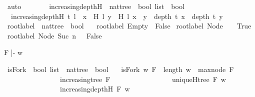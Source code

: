 \begin{isabellebody}
\ auto\ \isanewline
\ \ \isamarkupfalse%
%
\endisatagproof
{\isafoldproof}%
%
\isadelimproof
\isanewline
%
\endisadelimproof
\ \ \isanewline
{}\isamarkupfalse%
\ increasing{\isacharunderscore}depth{\isacharunderscore}H\ {\isacharcolon}{\isacharcolon}\ {\isachardoublequoteopen}nattree\ {\isasymRightarrow}\ bool\ list\ {\isasymRightarrow}\ bool{\isachardoublequoteclose}\ \ \isanewline
\ \ {\isachardoublequoteopen}increasing{\isacharunderscore}depth{\isacharunderscore}H\ t\ l\ {\isacharequal}\ {\isacharparenleft}{\isasymforall}x\ {\isasymin}\ H\ l{\isachardot}\ {\isasymforall}y\ {\isasymin}\ H\ l{\isachardot}\ x\ {\isacharless}\ y\ {\isasymlongrightarrow}\ depth\ t\ x\ {\isacharless}\ depth\ t\ y{\isacharparenright}{\isachardoublequoteclose}\isanewline
\isanewline
{}\isamarkupfalse%
\ root{\isacharunderscore}label{}\ {\isacharcolon}{\isacharcolon}\ {\isachardoublequoteopen}nattree\ {\isasymRightarrow}\ bool{\isachardoublequoteclose}\ \isanewline
\ \ {\isachardoublequoteopen}root{\isacharunderscore}label{}\ Empty\ {\isacharequal}\ False{\isachardoublequoteclose}\isanewline
{\isacharbar}\ {\isachardoublequoteopen}root{\isacharunderscore}label{}\ {\isacharparenleft}Node\ {}\ {\isacharunderscore}{\isacharparenright}\ {\isacharequal}\ True{\isachardoublequoteclose}\isanewline
{\isacharbar}\ {\isachardoublequoteopen}root{\isacharunderscore}label{}\ {\isacharparenleft}Node\ {\isacharparenleft}Suc\ n{\isacharparenright}\ {\isacharunderscore}{\isacharparenright}\ {\isacharequal}\ False{\isachardoublequoteclose}%
\begin{isamarkuptext}%
F |- w%
\end{isamarkuptext}\isamarkuptrue%
\isamarkupfalse%
\ isFork\ {\isacharcolon}{\isacharcolon}\ {\isachardoublequoteopen}bool\ list\ {\isasymRightarrow}\ nattree\ {\isasymRightarrow}\ bool{\isachardoublequoteclose}\ \isanewline
\ \ {\isachardoublequoteopen}isFork\ w\ F\ {\isacharequal}\ {\isacharparenleft}{\isacharparenleft}length\ w\ {\isasymge}\ max{\isacharunderscore}node\ F{\isacharparenright}\ \isanewline
\ \ \ \ \ \ \ \ \ \ \ \ \ \ \ {\isasymand}\ {\isacharparenleft}increasing{\isacharunderscore}tree\ F{\isacharparenright}\ \isanewline
\ \ \ \ \ \ \ \ \ \ \ \ \ \ \ {\isasymand}\ {\isacharparenleft}uniqueH{\isacharunderscore}tree\ F\ w{\isacharparenright}\ \isanewline
\ \ \ \ \ \ \ \ \ \ \ \ \ \ \ {\isasymand}\ {\isacharparenleft}increasing{\isacharunderscore}depth{\isacharunderscore}H\ F\ w{\isacharparenright}\isanewline

\end{isabellebody}
